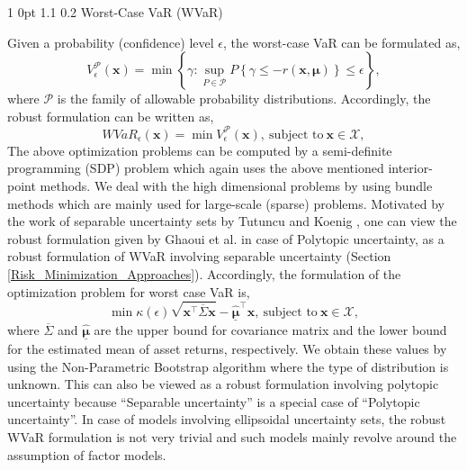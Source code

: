 \documentclass[12pt]{article}
\makeatletter
\numberwithin{equation}{section}
\renewcommand{\subsection}{
  \@startsection
  {subsection}%
  {1}%
  {0pt}%
  {1.1\baselineskip}%
  {0.2\baselineskip}%
  {\sc \centering}%
}
\makeatother
\begin{document}
\subsection{Worst-Case VaR (WVaR)}

Given a probability (confidence) level $\epsilon$, the worst-case VaR can be formulated as,
\begin{equation}
V_{\epsilon}^{\mathcal{P}}(\mathbf{x})=\min\left\{\gamma: \sup_{P \in \mathcal{P}} P\left\{\gamma \leq -r(\mathbf{x},\boldsymbol{\mu})\right\}
\leq \epsilon \right\},
\label{fig:wc_var_basic}
\end{equation}
where $\mathcal{P}$ is the family of allowable probability distributions. Accordingly, the robust formulation can be written as,
\begin{equation}
WVaR_{\epsilon}(\mathbf{x})=\min V_{\epsilon}^{\mathcal{P}}(\mathbf{x}),~\text{subject to}~\mathbf{x} \in \mathcal{X},
\label{fig:wc_var_general}
\end{equation}
The above optimization problems can be computed by a semi-definite programming (SDP) problem which again uses the above mentioned interior-point methods.
We deal with the high dimensional problems by using bundle methods which are mainly used for large-scale (sparse) problems.
Motivated by the work of separable uncertainty sets by Tutuncu and Koenig \cite{tutuncu}, one can view the robust formulation given by Ghaoui et al. \cite{ghaoui03} in case of Polytopic uncertainty, as a robust formulation of WVaR involving separable uncertainty (Section \ref{Risk_Minimization_Approaches}).
Accordingly, the formulation of the optimization problem for worst case VaR is,
\begin{equation}
\min \kappa(\epsilon)\sqrt{\mathbf{x}^{\top}\overline{\Sigma}\mathbf{x}}-\underline{\hat{\boldsymbol{\mu}}}^{\top}\mathbf{x},~\text{subject to}~
\mathbf{x} \in \mathcal{X},
\label{fig:var_poly}
\end{equation}
where $\overline{\Sigma}$ and $\underline{\hat{\boldsymbol{\mu}}}$ are the upper bound for covariance matrix and the lower bound for the estimated mean of asset returns, respectively. We obtain these values by using the Non-Parametric Bootstrap algorithm where the type of distribution is unknown. This can also be viewed as a robust formulation involving polytopic uncertainty because ``Separable uncertainty'' is a special case of ``Polytopic uncertainty''. In case of models involving ellipsoidal uncertainty sets, the robust WVaR formulation is not very trivial and such models mainly revolve around the assumption of factor models.
\end{document}

